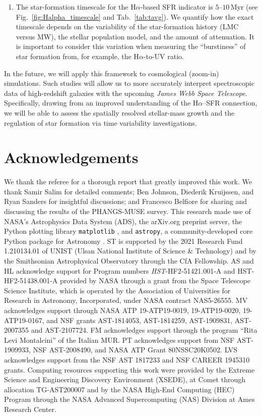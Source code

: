 \documentclass[fleqn,usenatbib]{mnras}
\begin{document}
\begin{enumerate}
    \item The star-formation timescale for the H$\alpha$-based SFR indicator is $5$--$10$\,Myr (see Fig.~\ref{fig:Halpha_timescale} and Tab.~\ref{tab:tavg}). We quantify how the exact timescale depends on the variability of the star-formation history (LMC versus MW), the stellar population model, and the amount of attenuation. It is important to consider this variation when measuring the ``burstiness'' of star formation from, for example, the H$\alpha$-to-UV ratio.
\end{enumerate}

In the future, we will apply this framework to cosmological (zoom-in) simulations. Such studies will allow us to more accurately interpret spectroscopic data of high-redshift galaxies with the upcoming \textit{James Webb Space Telescope}. Specifically, drawing from an improved understanding of the H$\alpha$--SFR connection, we will be able to assess the spatially resolved stellar-mass growth and the regulation of star formation via time variability investigations.


\section*{Acknowledgements}

We thank the referee for a thorough report that greatly improved this work. We thank Samir Salim for detailed comments; Ben Johnson, Diederik Kruijssen, and Ryan Sanders for insightful discussions; and Francesco Belfiore for sharing and discussing the results of the PHANGS-MUSE survey. This research made use of NASA's Astrophysics Data System (ADS), the arXiv.org preprint server, the Python plotting library \texttt{matplotlib} \citep{hunter07}, and \texttt{astropy}, a community-developed core Python package for Astronomy \citep{astropycollaboration13, astropycollaboration18}. ST is supported by the 2021 Research Fund 1.210134.01 of UNIST (Ulsan National Institute of Science \& Technology) and by the Smithsonian Astrophysical Observatory through the CfA Fellowship.
AS and HL acknowledge support for Program numbers \textit{HST}-HF2-51421.001-A and HST-HF2-51438.001-A provided by NASA through a grant from the Space Telescope Science Institute, which is operated by the Association of Universities for Research in Astronomy, Incorporated, under NASA contract NAS5-26555.
MV acknowledges support through NASA ATP 19-ATP19-0019, 19-ATP19-0020, 19-ATP19-0167, and NSF grants AST-1814053, AST-1814259, AST-1909831, AST-2007355 and AST-2107724.
FM acknowledges support through the program ``Rita Levi Montalcini'' of the Italian MUR.
PT acknowledges support from NSF AST-1909933, NSF AST-2008490, and NASA ATP Grant 80NSSC20K0502.
LVS acknowledges support from the NSF AST 1817233 and NSF CAREER 1945310 grants.
Computing resources supporting this work were provided by the Extreme Science and Engineering Discovery Environment (XSEDE), at Comet through allocation TG-AST200007 and by the NASA High-End Computing (HEC) Program through the NASA Advanced Supercomputing (NAS) Division at Ames Research Center.
\end{document}
